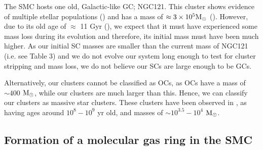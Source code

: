 \documentclass[fleqn,usenatbib]{mnras}
\begin{document}
The SMC hosts one old, Galactic-like GC; NGC121. This cluster shows evidence of multiple stellar populations (\citealt{M5_Dalessandro_et_al2016}) and has a mass of $\approx 3 \times 10^5 \rm{M}_{\odot}$ (\citealt{M2_Mackey_Gilmore2003}).
However, due to its old age of $\approx$ 11 Gyr (\citealt{M3_Glatt_et_al2008}), we expect that it must have experienced some mass loss during its evolution and therefore, its initial mass must have been much higher. As our initial SC masses are smaller than the current mass of NGC121 (i.e. see Table 3) and we do not evolve our system long enough to test for cluster stripping and mass loss, we do not believe our SCs are large enough to be GCs. 

Alternatively, our clusters cannot be classified as OCs, as OCs have a mass of ${\sim}400$ ${\rm M}_{\odot}$, while our clusters are much larger than this. Hence, we can classify our clusters as massive star clusters. These clusters have been observed in \cite{52Piatti2021}, as having ages around $10^8-10^9$ yr old, and masses of ${\sim}10^{3.5}-10^4$ ${\rm M}_{\odot}$.\newline


\subsection{Formation of a molecular gas ring in the SMC}
\end{document}
